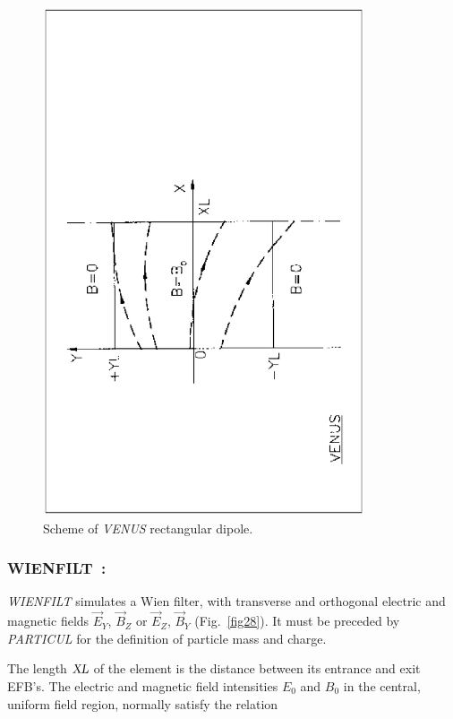 \vfill
\begin{figure}[H]
\centerline{\includegraphics[height=15cm,angle=-90]{Fig32.ps}}
\caption{\label{fig32}Scheme of \textsl{VENUS} rectangular dipole.}
\end{figure}
\vfill

\newpage

\subsubsection*{WIENFILT~: \WIENFILTTitl}\label{WIENFILT} 
\medskip 

\textsl{WIENFILT} simulates a Wien filter, with transverse and
orthogonal electric and magnetic fields $ \vec  E_Y$,  $ \vec  B_Z $ or $ \vec  E_Z$, 
 $ \vec  B_Y$ (Fig.~\ref{fig28}).
 It must be preceded by \textsl{PARTICUL} for the definition of particle mass and charge.  
\medskip

\noindent The length $ \textsl{XL} $ of the element is the distance between its
entrance and exit EFB's. The electric and magnetic field intensities $ E_0 $ and $ B_0 $ in the 
central, uniform field region, normally satisfy the relation
 
